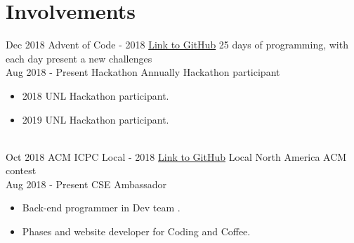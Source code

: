 \documentclass[letterpaper]{twentysecondcv} %
\begin{document}
\section{Involvements}
\begin{twenty}
	\twentyitem
    	{Dec 2018}
		{}
        {Advent of Code - 2018}
        {\href{https://github.com/HuyNVuong/AdventOfCode}{Link to GitHub}}
        {}
        {
        25 days of programming, with each day present a new challenges
        {}
        }
    \\
    \twentyitem
    	{Aug 2018}
		{- Present}
        {Hackathon}
        {}
        {Annually Hackathon participant}
        {
        {\begin{itemize}
        \item 2018 UNL Hackathon participant.
        \item 2019 UNL Hackathon participant.
		\end{itemize}}
        }
    \\
    \twentyitem
    	{Oct 2018}
		{}
        {ACM ICPC Local - 2018}
        {\href{https://github.com/HuyNVuong/ACM-2018}{Link to GitHub}}
        {}
        {
        Local North America ACM contest
        {}
        }
    \\
    \twentyitem
    	{Aug 2018}
		{- Present}
        {CSE Ambassador}
        {}
        {}
        {
        {\begin{itemize}
        \item Back-end programmer in Dev team .
        \item Phases and website developer for Coding and Coffee.
		\end{itemize}}
        }
\end{twenty}

\end{document}
